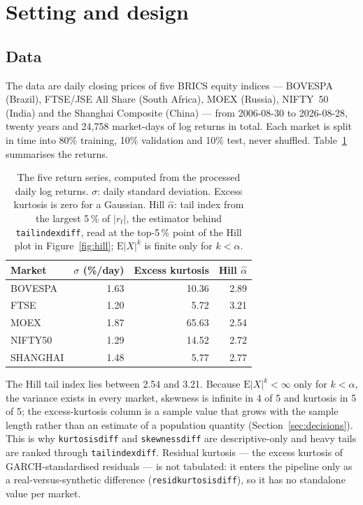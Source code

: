 \documentclass[11pt,a4paper]{article}
\makeatletter
\DeclareRobustCommand{\_}{\ifmmode\nfss@text{\textunderscore}\else\textunderscore\allowbreak\fi}
\makeatother
\begin{document}
\section{Setting and design}
\label{sec:design}

\subsection{Data}
\label{sec:data}
The data are daily closing prices of five BRICS equity indices --- BOVESPA (Brazil), FTSE/JSE All Share (South Africa), MOEX (Russia), NIFTY~50 (India) and the Shanghai Composite (China) --- from 2006-08-30 to 2026-08-28, twenty years and 24,758 market-days of log returns in total. Each market is split in time into 80\% training, 10\% validation and 10\% test, never shuffled. Table~\ref{tab:data} summarises the returns.

\begin{table}[htbp]
\centering
\caption{The five return series, computed from the processed daily log returns. $\sigma$: daily standard deviation. Excess kurtosis is zero for a Gaussian. Hill $\hat\alpha$: tail index from the largest 5\,\% of $|r_t|$, the estimator behind \texttt{tail\_index\_diff}, read at the top-5\,\% point of the Hill plot in Figure~\ref{fig:hill}; $\mathrm{E}|X|^k$ is finite only for $k<\alpha$.}
\label{tab:data}
\begin{tabular}{@{}lrrr@{}}
\toprule
Market & $\sigma$ (\%/day) & Excess kurtosis & Hill $\hat\alpha$ \\
\midrule
BOVESPA & 1.63 & 10.36 & 2.89 \\
FTSE & 1.20 & 5.72 & 3.21 \\
MOEX & 1.87 & 65.63 & 2.54 \\
NIFTY50 & 1.29 & 14.52 & 2.72 \\
SHANGHAI & 1.48 & 5.77 & 2.77 \\
\bottomrule
\end{tabular}
\end{table}

The Hill tail index lies between 2.54 and 3.21. Because $\mathrm{E}|X|^k<\infty$ only for $k<\alpha$, the variance exists in every market, skewness is infinite in 4 of 5 and kurtosis in 5 of 5; the excess-kurtosis column is a sample value that grows with the sample length rather than an estimate of a population quantity (Section~\ref{sec:decisions}). This is why \texttt{kurtosis\_diff} and \texttt{skewness\_diff} are descriptive-only and heavy tails are ranked through \texttt{tail\_index\_diff}. Residual kurtosis --- the excess kurtosis of GARCH-standardised residuals --- is not tabulated: it enters the pipeline only as a real-versus-synthetic difference (\texttt{resid\_kurtosis\_diff}), so it has no standalone value per market.
\end{document}
